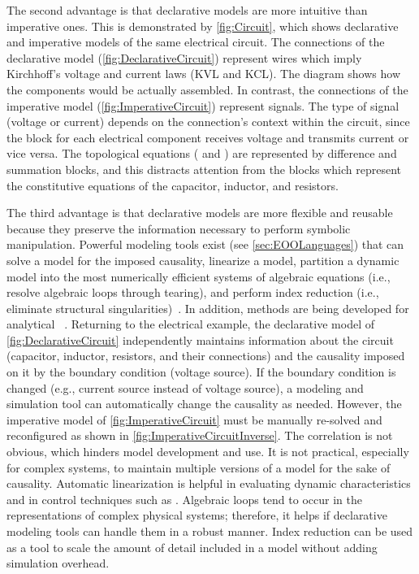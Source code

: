 The second advantage is that declarative models are more intuitive than imperative ones.  This is demonstrated by \autoref{fig:Circuit}, which shows declarative and imperative models of the same electrical circuit.  The connections of the declarative model (\autoref{fig:DeclarativeCircuit}) represent wires which imply Kirchhoff's voltage and current laws (KVL and KCL).  The diagram shows how the components would be actually assembled.  In contrast, the connections of the imperative model (\autoref{fig:ImperativeCircuit}) represent signals.  The type of signal (voltage or current) depends on the connection's context within the circuit, since the block for each electrical component receives voltage and transmits current or vice versa.  The topological equations ( and ) are represented by difference and summation blocks, and this distracts attention from the blocks which represent the constitutive equations of the capacitor, inductor, and resistors.

The third advantage is that declarative models are more flexible and reusable because they preserve the information necessary to perform symbolic manipulation.  Powerful modeling tools exist (see \autoref{sec:EOOLanguages}) that can solve a model for the imposed causality, linearize a model, partition a dynamic model into the most numerically efficient systems of algebraic equations (i.e., resolve algebraic loops through tearing), and perform index reduction (i.e., eliminate structural singularities)~\cite{Cellier2006, Mattsson1993b}. %
In addition, methods are being developed for analytical ~\cite{Donida2010}.  Returning to the electrical example, the declarative model of \autoref{fig:DeclarativeCircuit} independently maintains information about the circuit (capacitor, inductor, resistors, and their connections) and the causality imposed on it by the boundary condition (voltage source).  If the boundary condition is changed (e.g., current source instead of voltage source), a modeling and simulation tool can automatically change the causality as needed.  However, the imperative model of \autoref{fig:ImperativeCircuit} must be manually re-solved and reconfigured as shown in \autoref{fig:ImperativeCircuitInverse}.  The correlation is not obvious, which hinders model development and use.  It is not practical, especially for complex systems, to maintain multiple versions of a model for the sake of causality.  Automatic linearization is helpful in evaluating dynamic characteristics and in control techniques such as .  Algebraic loops tend to occur in the representations of complex physical systems; therefore, it helps if declarative modeling tools can handle them in a robust manner.  Index reduction can be used as a tool to scale the amount of detail included in a model without adding simulation overhead.


